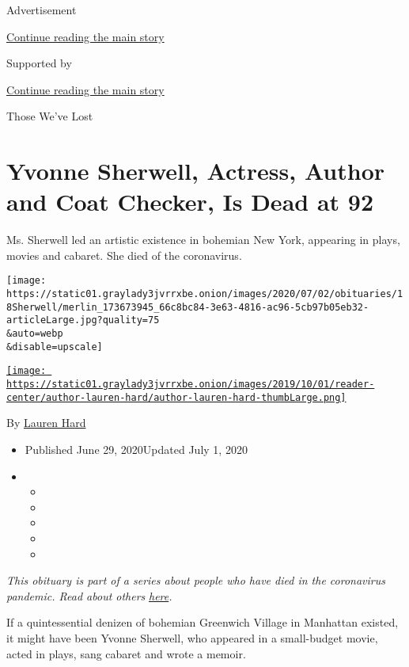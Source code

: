 Advertisement

\protect\hyperlink{after-top}{Continue reading the main story}

Supported by

\protect\hyperlink{after-sponsor}{Continue reading the main story}

Those We've Lost

\hypertarget{yvonne-sherwell-actress-author-and-coat-checker-is-dead-at-92}{%
\section{Yvonne Sherwell, Actress, Author and Coat Checker, Is Dead at
92}\label{yvonne-sherwell-actress-author-and-coat-checker-is-dead-at-92}}

Ms. Sherwell led an artistic existence in bohemian New York, appearing
in plays, movies and cabaret. She died of the coronavirus.

\texttt{[image: https://static01.graylady3jvrrxbe.onion/images/2020/07/02/obituaries/18Sherwell/merlin\_173673945\_66c8bc84-3e63-4816-ac96-5cb97b05eb32-articleLarge.jpg?quality=75\\\&auto=webp\\\&disable=upscale]}

\href{https://www.nytimes3xbfgragh.onion/by/lauren-hard}{\texttt{[image: https://static01.graylady3jvrrxbe.onion/images/2019/10/01/reader-center/author-lauren-hard/author-lauren-hard-thumbLarge.png]}}

By \href{https://www.nytimes3xbfgragh.onion/by/lauren-hard}{Lauren Hard}

\begin{itemize}
\item
  Published June 29, 2020Updated July 1, 2020
\item
  \begin{itemize}
  \item
  \item
  \item
  \item
  \item
  \end{itemize}
\end{itemize}

\emph{This obituary is part of a series about people who have died in
the coronavirus pandemic. Read about others}
\href{https://www.nytimes3xbfgragh.onion/interactive/2020/obituaries/people-died-coronavirus-obituaries.html}{\emph{here}}\emph{.}

If a quintessential denizen of bohemian Greenwich Village in Manhattan
existed, it might have been Yvonne Sherwell, who appeared in a
small-budget movie, acted in plays, sang cabaret and wrote a memoir.

